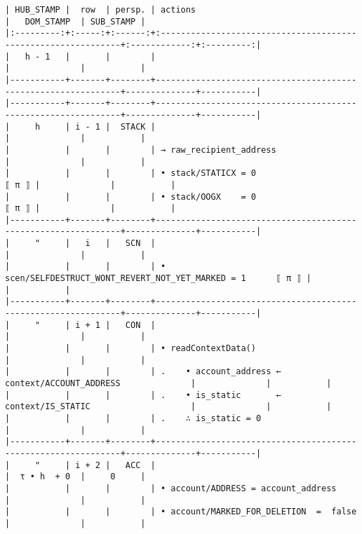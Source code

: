 \documentclass[varwidth=\maxdimen,margin=0.5cm,multi={verbatim}]{standalone}
\begin{document}
\begin{verbatim}
| HUB_STAMP |  row  | persp. | actions                                                       |   DOM_STAMP  | SUB_STAMP |
|:---------:+:-----:+:------:+:--------------------------------------------------------------+:------------:+:---------:|
|   h - 1   |       |        |                                                               |              |           |
|-----------+-------+--------+---------------------------------------------------------------+--------------+-----------|
|-----------+-------+--------+---------------------------------------------------------------+--------------+-----------|
|     h     | i - 1 |  STACK |                                                               |              |           |
|           |       |        | → raw_recipient_address                                       |              |           |
|           |       |        | • stack/STATICX = 0                                     ⟦ π ⟧ |              |           |
|           |       |        | • stack/OOGX    = 0                                     ⟦ π ⟧ |              |           |
|-----------+-------+--------+---------------------------------------------------------------+--------------+-----------|
|     "     |   i   |   SCN  |                                                               |              |           |
|           |       |        | • scen/SELFDESTRUCT_WONT_REVERT_NOT_YET_MARKED = 1      ⟦ π ⟧ |              |           |
|-----------+-------+--------+---------------------------------------------------------------+--------------+-----------|
|     "     | i + 1 |   CON  |                                                               |              |           |
|           |       |        | • readContextData()                                           |              |           |
|           |       |        | .    • account_address ← context/ACCOUNT_ADDRESS              |              |           |
|           |       |        | .    • is_static       ← context/IS_STATIC                    |              |           |
|           |       |        | .    ∴ is_static = 0                                          |              |           |
|-----------+-------+--------+---------------------------------------------------------------+--------------+-----------|
|     "     | i + 2 |   ACC  |                                                               |  τ • h  + 0  |     0     |
|           |       |        | • account/ADDRESS = account_address                           |              |           |
|           |       |        | • account/MARKED_FOR_DELETION  =  false                       |              |           |

\end{verbatim}
\end{document}

